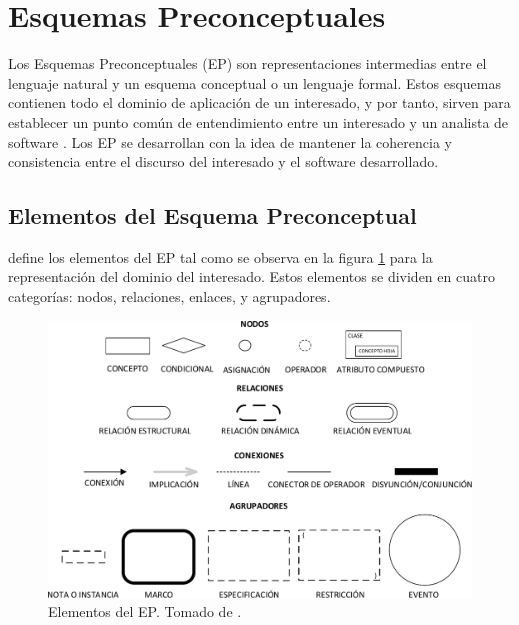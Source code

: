 
\section{Esquemas Preconceptuales}

Los Esquemas Preconceptuales (EP) son representaciones intermedias entre el lenguaje natural y un esquema conceptual o un lenguaje formal. Estos esquemas contienen todo el dominio de aplicación de un interesado, y por tanto, sirven para establecer un punto común de entendimiento entre un interesado y un analista de software \citep{zapata2007phd}. Los EP se desarrollan con la idea de mantener la coherencia y consistencia entre el discurso del interesado y el software desarrollado. 

\subsection{Elementos del Esquema Preconceptual}
\cite{zapata2012unc} define los elementos del EP tal como se observa en la figura \ref{fig:InitialPS} para la representación del dominio del interesado. Estos elementos se dividen en cuatro categorías: nodos, relaciones, enlaces, y agrupadores.\\

\begin{figure}[h]
	\centering%
	\includegraphics[scale=0.51]{Fig/ElementosDelEP.pdf}%
	\caption[Elementos del EP.]{Elementos del EP. Tomado de \citep{zapata2012unc}.} \label{fig:InitialPS}
\end{figure}

